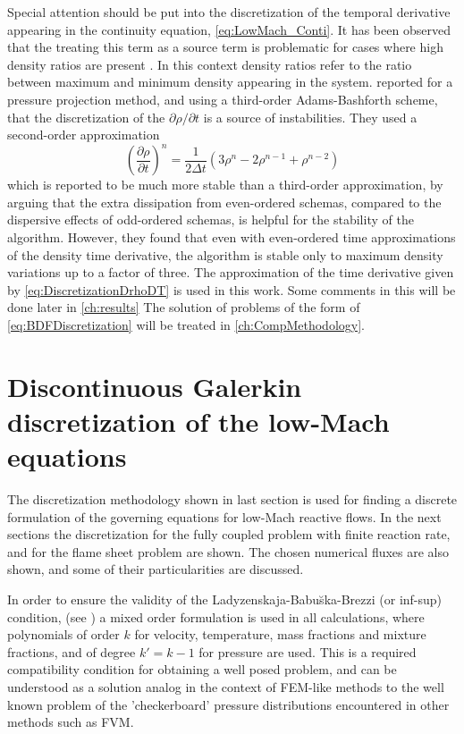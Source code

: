 Special attention should be put into the discretization of the temporal derivative appearing in the continuity equation, \cref{eq:LowMach_Conti}. It has been observed that the treating this term as a source term is problematic  for cases where high density ratios are present \parencite{cookDirectNumericalSimulation1996,nicoudConservativeHighOrderFiniteDifference2000}. In this context density ratios refer to the ratio between maximum and minimum density appearing in the system. \textcite{cookDirectNumericalSimulation1996} reported for a pressure projection method, and using a third-order Adams-Bashforth scheme, that the discretization of the $\partial \rho /\partial t$ is a source of instabilities. They used a second-order approximation
\begin{equation}
	\left(\frac{\partial \rho}{\partial t} \right)^n= \frac{1}{2\Delta t}\left(3\rho^n-2\rho^{n-1}+\rho^{n-2}\right) \label{eq:DiscretizationDrhoDT}
\end{equation}
which is reported to be much more stable than a third-order approximation, by arguing that the extra dissipation from even-ordered schemas, compared to the dispersive effects of odd-ordered schemas, is helpful for the stability of the algorithm. However, they found that even with even-ordered time approximations of the density time derivative, the algorithm is stable only to maximum density variations up to a factor of three. The approximation of the time derivative given by \cref{eq:DiscretizationDrhoDT} is used in this work. Some comments in this will be done later in \cref{ch:results}
The solution of problems of the form of \cref{eq:BDFDiscretization} will be treated in \cref{ch:CompMethodology}.
\section{Discontinuous Galerkin discretization of the low-Mach equations}
The discretization methodology shown in last section is used for finding a discrete formulation of the governing equations for low-Mach reactive flows. In the next sections the discretization for the fully coupled problem with finite reaction rate, and for the flame sheet problem are shown. The chosen numerical fluxes are also shown, and some of their particularities are discussed. 

In order to ensure the validity  of the  Ladyzenskaja-Babu\u{s}ka-Brezzi (or inf-sup) condition, (see \textcite{babuskaFiniteElementMethod1973})  a mixed order formulation is used in all calculations, where polynomials of order $k$ for velocity, temperature, mass fractions and mixture fractions, and of degree $k' = k-1$ for pressure are used. This is a required compatibility condition for obtaining a well posed problem, and can be understood as a solution analog in the context of FEM-like methods to the well known problem of the 'checkerboard' pressure distributions encountered in other methods such as FVM. \parencite{riceEqualorderVelocitypressureFormulation1986}
